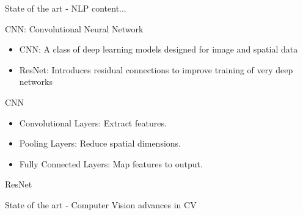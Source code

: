 \begin{frame}{State of the art - NLP}
content...
\end{frame}
\begin{frame}{CNN: Convolutional Neural Network}
	\begin{itemize}
		\item CNN: A class of deep learning models designed for image and spatial data
		\item ResNet: Introduces residual connections to improve training of very deep networks
	\end{itemize}
\end{frame}

\begin{frame}{CNN}
	\begin{itemize}
																		           	\item Convolutional Layers: Extract features.
																				\item Pooling Layers: Reduce spatial dimensions.

																				\item Fully Connected Layers: Map features to output.
																				\end{itemize}

\end{frame}

	\begin{frame}{ResNet}
\end{frame}


\begin{frame}{State of the art - Computer Vision}
	advances in CV

\end{frame}


